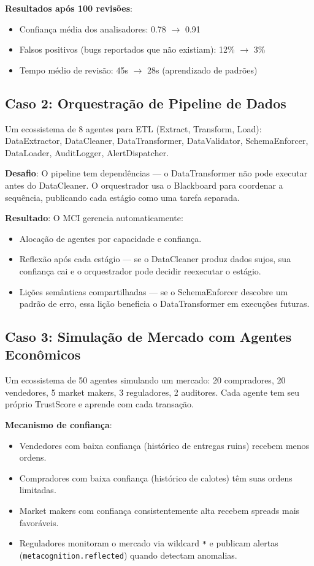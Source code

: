 \textbf{Resultados após 100 revisões}:
\begin{itemize}
    \item Confiança média dos analisadores: 0.78 $\rightarrow$ 0.91
    \item Falsos positivos (bugs reportados que não existiam): 12\% $\rightarrow$ 3\%
    \item Tempo médio de revisão: 45s $\rightarrow$ 28s (aprendizado de padrões)
\end{itemize}

\subsection{Caso 2: Orquestração de Pipeline de Dados}

Um ecossistema de 8 agentes para ETL (Extract, Transform, Load): DataExtractor, DataCleaner, DataTransformer, DataValidator, SchemaEnforcer, DataLoader, AuditLogger, AlertDispatcher.

\textbf{Desafio}: O pipeline tem dependências — o DataTransformer não pode executar antes do DataCleaner. O orquestrador usa o Blackboard para coordenar a sequência, publicando cada estágio como uma tarefa separada.

\textbf{Resultado}: O MCI gerencia automaticamente:
\begin{itemize}
    \item Alocação de agentes por capacidade e confiança.
    \item Reflexão após cada estágio — se o DataCleaner produz dados sujos, sua confiança cai e o orquestrador pode decidir reexecutar o estágio.
    \item Lições semânticas compartilhadas — se o SchemaEnforcer descobre um padrão de erro, essa lição beneficia o DataTransformer em execuções futuras.
\end{itemize}

\subsection{Caso 3: Simulação de Mercado com Agentes Econômicos}

Um ecossistema de 50 agentes simulando um mercado: 20 compradores, 20 vendedores, 5 market makers, 3 reguladores, 2 auditores. Cada agente tem seu próprio TrustScore e aprende com cada transação.

\textbf{Mecanismo de confiança}:
\begin{itemize}
    \item Vendedores com baixa confiança (histórico de entregas ruins) recebem menos ordens.
    \item Compradores com baixa confiança (histórico de calotes) têm suas ordens limitadas.
    \item Market makers com confiança consistentemente alta recebem spreads mais favoráveis.
    \item Reguladores monitoram o mercado via wildcard \texttt{*} e publicam alertas (\texttt{metacognition.reflected}) quando detectam anomalias.
\end{itemize}

